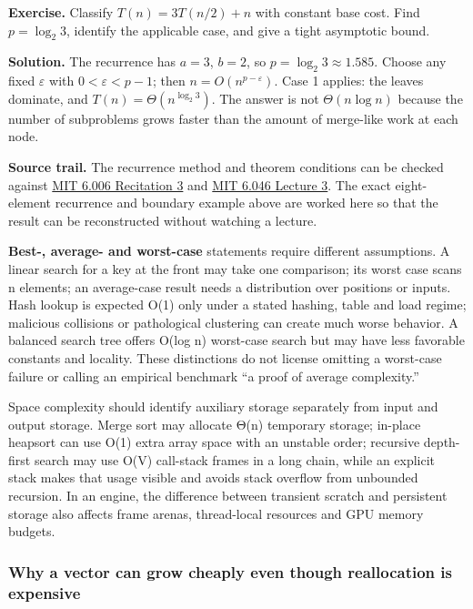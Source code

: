 \textbf{Exercise.} Classify \(T(n)=3T(n/2)+n\) with constant base cost. Find \(p=\log_2 3\), identify the applicable case, and give a tight asymptotic bound.

\textbf{Solution.} The recurrence has \(a=3\), \(b=2\), so \(p=\log_2 3\approx1.585\). Choose any fixed \(\varepsilon\) with \(0<\varepsilon<p-1\); then \(n=O(n^{p-\varepsilon})\). Case 1 applies: the leaves dominate, and \(T(n)=\Theta(n^{\log_2 3})\). The answer is not \(\Theta(n\log n)\) because the number of subproblems grows faster than the amount of merge-like work at each node.

\textbf{Source trail.} The recurrence method and theorem conditions can be checked against \href{https://ocw.mit.edu/courses/6-006-introduction-to-algorithms-spring-2020/1869dbf640ded6b31f1bd369d2001ef5_MIT6_006S20_r03.pdf}{MIT 6.006 Recitation 3} and \href{https://ocw.mit.edu/courses/6-046j-introduction-to-algorithms-sma-5503-fall-2005/9cdb6914be3e87215cb86f327ee4180b_lec3.pdf}{MIT 6.046 Lecture 3}. The exact eight-element recurrence and boundary example above are worked here so that the result can be reconstructed without watching a lecture.

\textbf{Best-, average- and worst-case} statements require different assumptions. A linear search for a key at the front may take one comparison; its worst case scans n elements; an average-case result needs a distribution over positions or inputs. Hash lookup is expected O(1) only under a stated hashing, table and load regime; malicious collisions or pathological clustering can create much worse behavior. A balanced search tree offers O(log n) worst-case search but may have less favorable constants and locality. These distinctions do not license omitting a worst-case failure or calling an empirical benchmark ``a proof of average complexity.''

Space complexity should identify auxiliary storage separately from input and output storage. Merge sort may allocate Θ(n) temporary storage; in-place heapsort can use O(1) extra array space with an unstable order; recursive depth-first search may use O(V) call-stack frames in a long chain, while an explicit stack makes that usage visible and avoids stack overflow from unbounded recursion. In an engine, the difference between transient scratch and persistent storage also affects frame arenas, thread-local resources and GPU memory budgets.

\subsubsection{Why a vector can grow cheaply even though reallocation is expensive}\label{why-a-vector-can-grow-cheaply-even-though-reallocation-is-expensive}

